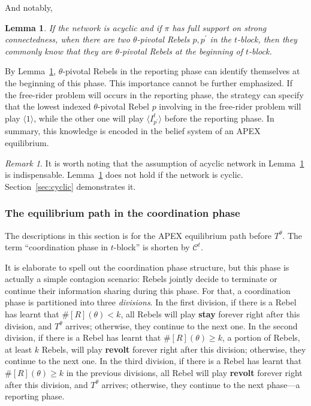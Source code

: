 \documentclass[12pt,letter]{article}
\newcommand{\Kappa}{\mathcal{C}}
\newtheorem{lemma}{Lemma}[section]
\theoremstyle{definition}
\theoremstyle{remark}
\newtheorem*{remark}{Remark}
\theoremstyle{claim}
\begin{document}
And notably,

\begin{lemma}
\label{lemman_pivotals_CK}
If the network is acyclic and if $\pi$ has full support on strong connectedness, when there are two $\theta$-pivotal Rebels $p,p^{'}$ in the $t$-block, then they commonly know that they are $\theta$-pivotal Rebels at the beginning of $t$-block.
\end{lemma}

By Lemma~\ref{lemman_pivotals_CK}, $\theta$-pivotal Rebels in the reporting phase can identify themselves at the beginning of this phase. This importance cannot be further emphasized. If the free-rider problem will occurs in the reporting phase, the strategy can specify that the lowest indexed $\theta$-pivotal Rebel $p$ involving in the free-rider problem will play $\langle 1 \rangle$, while the other one will play $\langle I^t_{p^{'}} \rangle$ before the reporting phase. In summary, this knowledge is encoded in the belief system of an APEX equilibrium. 

\begin{remark}
It is worth noting that the assumption of acyclic network in Lemma~\ref{lemman_pivotals_CK} is indispensable. Lemma~\ref{lemman_pivotals_CK} does not hold if the network is cyclic. Section~\ref{sec:cyclic} demonstrates it.
\end{remark}






\subsubsection{The equilibrium path in the coordination phase}
\label{sec:eq_cd}
The descriptions in this section is for the APEX equilibrium path {before} $T^{\theta}$. The term ``coordination phase in $t$-block'' is shorten by $\Kappa^{t}$.  

It is elaborate to spell out the coordination phase structure, but this phase is actually a simple contagion scenario: Rebels jointly decide to terminate or continue their information sharing during this phase. For that, a coordination phase is partitioned into three \textit{divisions}. In the first division, if there is a Rebel has learnt that $\#[R](\theta)<k$, all Rebels will play \textbf{stay} forever right after this division, and $T^{\theta}$ arrives; otherwise, they continue to the next one. In the second division, if there is a Rebel has learnt that $\#[R](\theta)\geq k$, a portion of Rebels, at least $k$ Rebels, will play \textbf{revolt} forever right after this division; otherwise, they continue to the next one. In the third division, if there is a Rebel has learnt that $\#[R](\theta)\geq k$ in the previous divisions, all Rebel will play \textbf{revolt} forever right after this division, and $T^{\theta}$ arrives; otherwise, they continue to the next phase---a reporting phase.
\end{document}
